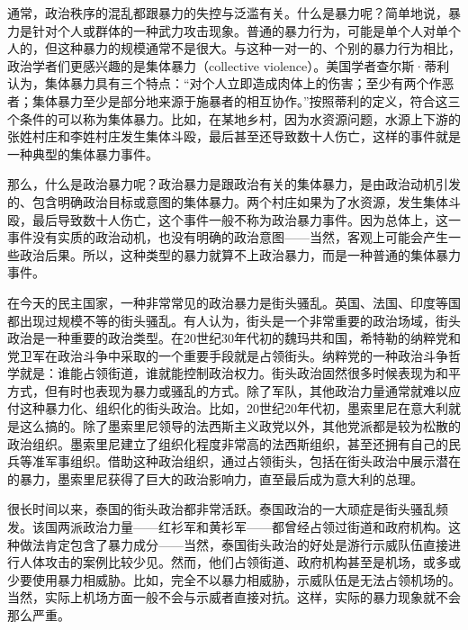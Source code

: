 
通常，政治秩序的混乱都跟暴力的失控与泛滥有关。什么是暴力呢？简单地说，暴力是针对个人或群体的一种武力攻击现象。普通的暴力行为，可能是单个人对单个人的，但这种暴力的规模通常不是很大。与这种一对一的、个别的暴力行为相比，政治学者们更感兴趣的是集体暴力（collective violence）。美国学者查尔斯·蒂利认为，集体暴力具有三个特点：“对个人立即造成肉体上的伤害；至少有两个作恶者；集体暴力至少是部分地来源于施暴者的相互协作。”按照蒂利的定义，符合这三个条件的可以称为集体暴力。比如，在某地乡村，因为水资源问题，水源上下游的张姓村庄和李姓村庄发生集体斗殴，最后甚至还导致数十人伤亡，这样的事件就是一种典型的集体暴力事件。

那么，什么是政治暴力呢？政治暴力是跟政治有关的集体暴力，是由政治动机引发的、包含明确政治目标或意图的集体暴力。两个村庄如果为了水资源，发生集体斗殴，最后导致数十人伤亡，这个事件一般不称为政治暴力事件。因为总体上，这一事件没有实质的政治动机，也没有明确的政治意图——当然，客观上可能会产生一些政治后果。所以，这种类型的暴力就算不上政治暴力，而是一种普通的集体暴力事件。

在今天的民主国家，一种非常常见的政治暴力是街头骚乱。英国、法国、印度等国都出现过规模不等的街头骚乱。有人认为，街头是一个非常重要的政治场域，街头政治是一种重要的政治类型。在20世纪30年代初的魏玛共和国，希特勒的纳粹党和党卫军在政治斗争中采取的一个重要手段就是占领街头。纳粹党的一种政治斗争哲学就是：谁能占领街道，谁就能控制政治权力。街头政治固然很多时候表现为和平方式，但有时也表现为暴力或骚乱的方式。除了军队，其他政治力量通常就难以应付这种暴力化、组织化的街头政治。比如，20世纪20年代初，墨索里尼在意大利就是这么搞的。除了墨索里尼领导的法西斯主义政党以外，其他党派都是较为松散的政治组织。墨索里尼建立了组织化程度非常高的法西斯组织，甚至还拥有自己的民兵等准军事组织。借助这种政治组织，通过占领街头，包括在街头政治中展示潜在的暴力，墨索里尼获得了巨大的政治影响力，直至最后成为意大利的总理。

很长时间以来，泰国的街头政治都非常活跃。泰国政治的一大顽症是街头骚乱频发。该国两派政治力量——红衫军和黄衫军——都曾经占领过街道和政府机构。这种做法肯定包含了暴力成分——当然，泰国街头政治的好处是游行示威队伍直接进行人体攻击的案例比较少见。然而，他们占领街道、政府机构甚至是机场，或多或少要使用暴力相威胁。比如，完全不以暴力相威胁，示威队伍是无法占领机场的。当然，实际上机场方面一般不会与示威者直接对抗。这样，实际的暴力现象就不会那么严重。

